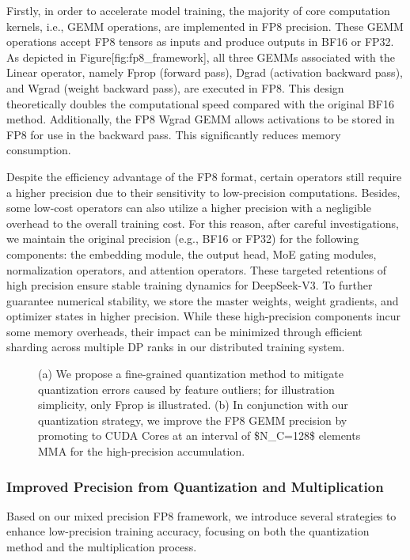 \documentclass[11pt,a4paper]{article}
\begin{document}
Firstly, in order to accelerate model training, the majority of core computation kernels, i.e., GEMM operations, are implemented in FP8 precision. These GEMM operations accept FP8 tensors as inputs and produce outputs in BF16 or FP32. As depicted in Figure[fig:fp8\_framework], all three GEMMs associated with the Linear operator, namely Fprop (forward pass), Dgrad (activation backward pass), and Wgrad (weight backward pass), are executed in FP8. This design theoretically doubles the computational speed compared with the original BF16 method. Additionally, the FP8 Wgrad GEMM allows activations to be stored in FP8 for use in the backward pass. This significantly reduces memory consumption.

Despite the efficiency advantage of the FP8 format, certain operators still require a higher precision due to their sensitivity to low-precision computations. Besides, some low-cost operators can also utilize a higher precision with a negligible overhead to the overall training cost. For this reason, after careful investigations, we maintain the original precision (e.g., BF16 or FP32) for the following components: the embedding module, the output head, MoE gating modules, normalization operators, and attention operators. These targeted retentions of high precision ensure stable training dynamics for DeepSeek-V3. To further guarantee numerical stability, we store the master weights, weight gradients, and optimizer states in higher precision. While these high-precision components incur some memory overheads, their impact can be minimized through efficient sharding across multiple DP ranks in our distributed training system.

\begin{figure}[h]
\caption{(a) We propose a fine-grained quantization method to mitigate quantization errors caused by feature outliers; for illustration simplicity, only Fprop is illustrated. (b) In conjunction with our quantization strategy, we improve the FP8 GEMM precision by promoting to CUDA Cores at an interval of \$N\_C=128\$ elements MMA for the high-precision accumulation.}
\end{figure}

\subsubsection{Improved Precision from Quantization and Multiplication}

Based on our mixed precision FP8 framework, we introduce several strategies to enhance low-precision training accuracy, focusing on both the quantization method and the multiplication process.
\end{document}

